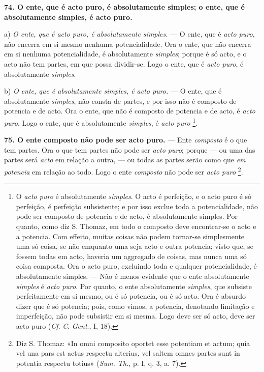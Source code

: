 \textbf{74. O ente, que é acto puro, é absolutamente simples; o ente, que é absolutamente simples, é acto puro.}

a) \emph{O ente, que é acto puro, é absolutamente simples.} --- O ente, que é \emph{acto puro}, não encerra em si mesmo nenhuma potencialidade. Ora o ente, que não encerra em si nenhuma potencialidade, é absolutamente \emph{simples}; porque é só acto, e o acto não tem partes, em que possa dividir-se. Logo o ente, que é \emph{acto puro}, é absolutamente \emph{simples}.

b) \emph{O ente, que é absolutamente simples, é acto puro.} --- O ente, que é absolutamente \emph{simples}, não consta de partes, e por isso não é composto de potencia e de acto. Ora o ente, que não é composto de potencia e de acto, é \emph{acto puro}. Logo o ente, que é absolutamente \emph{simples}, é \emph{acto puro} \footnote{O \emph{acto puro} é absolutamente \emph{simples}. O acto é perfeição, e o acto puro é só perfeição, é perfeição subsistente; e por isso exclue toda a potencialidade, não pode ser composto de potencia e de acto, é absolutamente simples. Por quanto, como diz S. Thomaz, em todo o composto deve encontrar-se o acto e a potencia. Com effeito, muitas coisas não podem tornar-se simplesmente uma só coisa, se não emquanto uma seja acto e outra potencia; visto que, se fossem todas em acto, haveria um aggregado de coisas, mas nunca uma só coisa composta. Ora o acto puro, excluindo toda e qualquer potencialidade, é absolutamente simples. --- Não é menos evidente que o ente absolutamente \emph{simples} é \emph{acto puro}. Por quanto, o ente absolutamente \emph{simples}, que subsiste perfeitamente em si mesmo, ou é só potencia, ou é só acto. Ora é absurdo dizer que é só potencia; pois, como vimos, a potencia, denotando limitação e imperfeição, não pode subsistir em si mesma. Logo deve ser só acto, deve ser acto puro (\emph{Cf}. \emph{C}. \emph{Gent}., I, 18).}.

\textbf{75. O ente composto não pode ser acto puro.} --- Ente \emph{composto} é o que tem partes. Ora o que tem partes não pode ser \emph{acto puro}; porque --- ou uma das partes será \emph{acto} em relação a outra, --- ou todas as partes serão como que \emph{em potencia} em relação ao todo. Logo o ente \emph{composto} não pode ser \emph{acto puro} \footnote{Diz S. Thomaz: «In omni composito oportet esse potentiam et actum; quia vel una pars est actus respectu alterius, vel saltem omnes partes sunt in potentia respectu totius» (\emph{Sum. Th.}, p. I, q. 3, a. 7).}.

